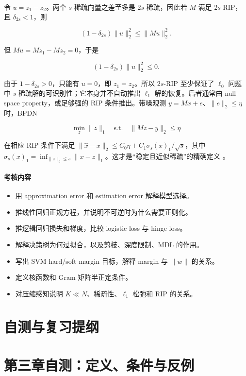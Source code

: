 \documentclass[11pt]{ctexart}
\begin{document}
令 \(u=z_1-z_2\)。两个 \(s\)-稀疏向量之差至多是 \(2s\)-稀疏，因此若 \(M\) 满足 \(2s\)-RIP，且 \(\delta_{2s}<1\)，则

\[
  (1-\delta_{2s})\|u\|_2^2
  \le
  \|Mu\|_2^2.
\]

但 \(Mu=Mz_1-Mz_2=0\)，于是

\[
  (1-\delta_{2s})\|u\|_2^2\le 0.
\]

由于 \(1-\delta_{2s}>0\)，只能有 \(u=0\)，即 \(z_1=z_2\)。所以 \(2s\)-RIP 至少保证了 \(\ell_0\) 问题中 \(s\)-稀疏解的可识别性；它本身并不自动推出 \(\ell_1\) 解的恢复。后者通常由 null-space property，或足够强的 RIP 条件推出。带噪观测 \(y=Mx+e\)、\(\|e\|_2\le\eta\) 时，BPDN

\[
  \min_z\|z\|_1\quad\text{s.t.}\quad\|Mz-y\|_2\le\eta
\]

在相应 RIP 条件下满足 \(\|\hat x-x\|_2\le C_0\eta+C_1\sigma_s(x)_1/\sqrt{s}\)，其中 \(\sigma_s(x)_1=\inf_{\|z\|_0\le s}\|x-z\|_1\)。这才是“稳定且近似稀疏”的精确定义 \parencite{candes2006compressive}。

\paragraph{考核内容}

\begin{itemize}
  \item 用 approximation error 和 estimation error 解释模型选择。
  \item 推线性回归正规方程，并说明不可逆时为什么需要正则化。
  \item 推逻辑回归损失和梯度，比较 logistic loss 与 hinge loss。
  \item 解释决策树为何过拟合，以及剪枝、深度限制、MDL 的作用。
  \item 写出 SVM hard/soft margin 目标，解释 margin 与 \(\|w\|\) 的关系。
  \item 定义核函数和 Gram 矩阵半正定条件。
  \item 对压缩感知说明 \(K\ll N\)、稀疏性、\(\ell_1\) 松弛和 RIP 的关系。
\end{itemize}



\section{自测与复习提纲}

\section{第三章自测：定义、条件与反例}
\end{document}
